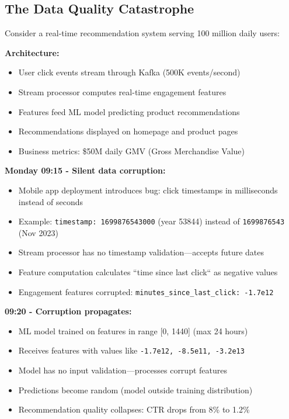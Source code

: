 \subsection{The Data Quality Catastrophe}

Consider a real-time recommendation system serving 100 million daily users:

\textbf{Architecture:}
\begin{itemize}
    \item User click events stream through Kafka (500K events/second)
    \item Stream processor computes real-time engagement features
    \item Features feed ML model predicting product recommendations
    \item Recommendations displayed on homepage and product pages
    \item Business metrics: \$50M daily GMV (Gross Merchandise Value)
\end{itemize}

\textbf{Monday 09:15 - Silent data corruption:}
\begin{itemize}
    \item Mobile app deployment introduces bug: click timestamps in milliseconds instead of seconds
    \item Example: \texttt{timestamp: 1699876543000} (year 53844) instead of \texttt{1699876543} (Nov 2023)
    \item Stream processor has no timestamp validation---accepts future dates
    \item Feature computation calculates ``time since last click`` as negative values
    \item Engagement features corrupted: \texttt{minutes\_since\_last\_click: -1.7e12}
\end{itemize}

\textbf{09:20 - Corruption propagates:}
\begin{itemize}
    \item ML model trained on features in range [0, 1440] (max 24 hours)
    \item Receives features with values like \texttt{-1.7e12, -8.5e11, -3.2e13}
    \item Model has no input validation---processes corrupt features
    \item Predictions become random (model outside training distribution)
    \item Recommendation quality collapses: CTR drops from 8\% to 1.2\%
\end{itemize}

